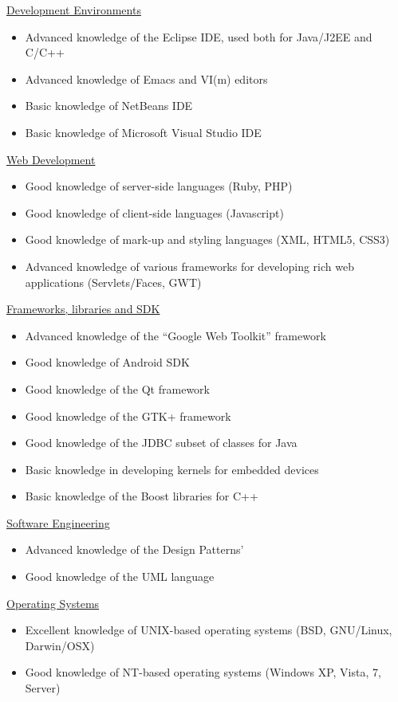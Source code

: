 \documentclass[margin]{res}
\begin{document}
\begin{resume}
	\underline{Development Environments}
		\begin{itemize}
			\item Advanced knowledge of the Eclipse IDE, used both for Java/J2EE and
				C/C++
			\item Advanced knowledge of Emacs and VI(m) editors
			\item Basic knowledge of NetBeans IDE
			\item Basic knowledge of Microsoft Visual Studio IDE
		\end{itemize}

	\underline{Web Development}
		\begin{itemize}
			\item Good knowledge of server-side languages (Ruby, PHP)
			\item Good knowledge of client-side languages (Javascript)
			\item Good knowledge of mark-up and styling languages (XML, HTML5, CSS3)
			\item Advanced knowledge of various frameworks for developing rich web applications 
				(Servlets/Faces, GWT)
		\end{itemize}

	\underline{Frameworks, libraries and SDK}
		\begin{itemize}
			\item Advanced knowledge of the ``Google Web Toolkit'' framework
			\item Good knowledge of Android SDK
			\item Good knowledge of the Qt framework
			\item Good knowledge of the GTK+ framework
			\item Good knowledge of the JDBC subset of classes for Java
			\item Basic knowledge in developing kernels for embedded devices
			\item Basic knowledge of the Boost libraries for C++
		\end{itemize}

	\underline{Software Engineering}
		\begin{itemize}
			\item Advanced knowledge of the Design Patterns' 
			\item Good knowledge of the UML language
		\end{itemize}

	\underline{Operating Systems}
		\begin{itemize}
			\item Excellent knowledge of UNIX-based operating systems (BSD, GNU/Linux, Darwin/OSX)
			\item Good knowledge of NT-based operating systems (Windows XP, Vista, 7, Server)
		\end{itemize}
	

\end{resume}
\end{document}
